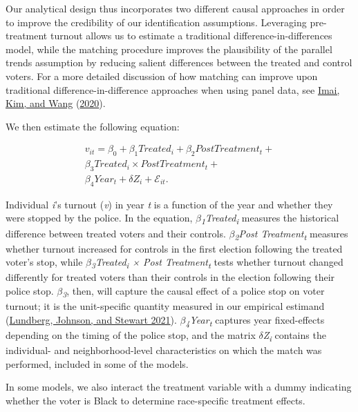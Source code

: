 \documentclass[
  12pt,
]{article}
\begin{document}
Our analytical design thus incorporates two different causal approaches in order to improve the credibility of our identification assumptions. Leveraging pre-treatment turnout allows us to estimate a traditional difference-in-differences model, while the matching procedure improves the plausibility of the parallel trends assumption by reducing salient differences between the treated and control voters. For a more detailed discussion of how matching can improve upon traditional difference-in-difference approaches when using panel data, see \protect\hyperlink{ref-Imai2020}{Imai, Kim, and Wang} (\protect\hyperlink{ref-Imai2020}{2020}).

We then estimate the following equation:

\begin{gather}
\label{eq:1}
v_{it}=\beta_0+\beta_1Treated_{i}+\beta_2Post Treatment_{t} + \nonumber \\
\beta_3Treated_{i}\times Post Treatment_{t} + \\
\beta_4Year_{t} + \delta{Z}_{i} + \mathcal{E}_{it}. \nonumber
\end{gather}

Individual \emph{i}'s turnout (\emph{v}) in year \emph{t} is a function of the year and whether they were stopped by the police. In the equation, \emph{\(\beta\)\textsubscript{1}Treated\textsubscript{i}} measures the historical difference between treated voters and their controls. \emph{\(\beta\)\textsubscript{2}Post Treatment\textsubscript{t}} measures whether turnout increased for controls in the first election following the treated voter's stop, while \emph{\(\beta\)\textsubscript{3}Treated\textsubscript{i} × Post Treatment\textsubscript{t}} tests whether turnout changed differently for treated voters than their controls in the election following their police stop. \emph{\(\beta\)\textsubscript{3}}, then, will capture the causal effect of a police stop on voter turnout; it is the unit-specific quantity measured in our empirical estimand (\protect\hyperlink{ref-Lundberg2021}{Lundberg, Johnson, and Stewart 2021}). \emph{\(\beta\)\textsubscript{4}Year\textsubscript{t}} captures year fixed-effects depending on the timing of the police stop, and the matrix \emph{\(\delta\)Z\textsubscript{i}} contains the individual- and neighborhood-level characteristics on which the match was performed, included in some of the models.

In some models, we also interact the treatment variable with a dummy indicating whether the voter is Black to determine race-specific treatment effects.
\end{document}
